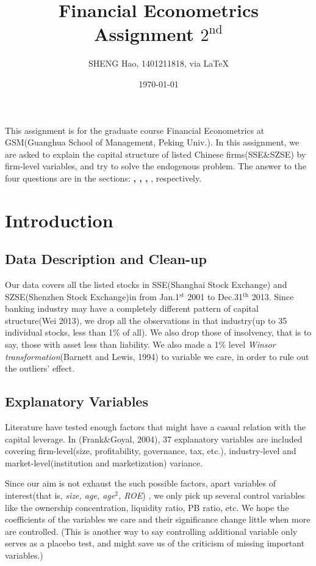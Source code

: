 \documentclass{article}
\begin{document}
\title{Financial Econometrics\\Assignment $2^{\text{nd}}$}
\author{{\normalsize SHENG Hao, 1401211818, via \LaTeX}}
\date{\today}

\maketitle

\def \Pr{{\rm Pr}}
\baselineskip 0.6cm

{\courier This} assignment is for the graduate course Financial Econometrics at GSM(Guanghua School of Management, Peking Univ.). In this assignment, we are asked to explain the capital structure of listed Chinese firms(SSE\&SZSE) by firm-level variables, and try to solve the endogenous problem. The answer to the four questions are in the sections: {\bf {}, , , }, respectively.


\section{Introduction}
\subsection{Data Description and Clean-up}
Our data covers all the listed stocks in SSE(Shanghai Stock Exchange) and SZSE(Shenzhen Stock Exchange)in from Jan.1$^{\text{st}}$ 2001 to Dec.31$^{\text{th}}$ 2013. Since banking industry may have a completely different pattern of capital structure(Wei 2013), we drop all the observations in that industry(up to 35 individual stocks, less than 1\% of all). We also drop those of insolvency, that is to say, those with asset less than liability. We also made a 1\% level {\it Winsor transformation}(Barnett and Lewis, 1994) to variable we care, in order to rule out the outliers' effect.

\subsection{Explanatory Variables}
Literature have tested enough factors that might have a casual relation with the capital leverage. In (Frank\&Goyal, 2004), 37 explanatory variables are included covering firm-level(size, profitability, governance, tax, etc.), industry-level and market-level(institution and marketization) variance.

Since our aim is not exhaust the such possible factors, apart variables of interest(that is, {\it size, age, age$^2$, ROE}) , we only pick up several control variables like the ownership concentration, liquidity ratio, PB ratio, etc. We hope the coefficients of the variables we care and their significance change little when more are controlled. (This is another way to say controlling additional variable only serves as a placebo test, and might save us of the criticism of missing important variables.)
\end{document}
